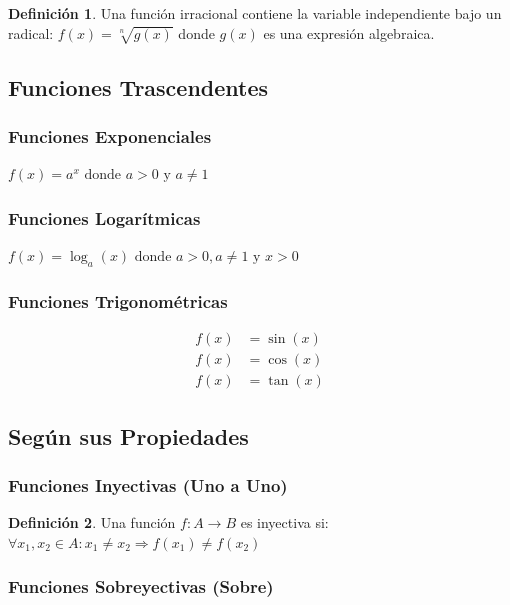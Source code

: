\documentclass[12pt, a4paper, oneside]{book}
\theoremstyle{definition}
\newtheorem{definicion}{Definición}[chapter]
\begin{document}
\begin{definicion}
Una función irracional contiene la variable independiente bajo un radical:
$f(x) = \sqrt[n]{g(x)}$
donde $g(x)$ es una expresión algebraica.
\end{definicion}

\subsection{Funciones Trascendentes}

\subsubsection{Funciones Exponenciales}
$f(x) = a^x \text{ donde } a > 0 \text{ y } a \neq 1$

\subsubsection{Funciones Logarítmicas}
$f(x) = \log_a(x) \text{ donde } a > 0, a \neq 1 \text{ y } x > 0$

\subsubsection{Funciones Trigonométricas}
\begin{align}
f(x) &= \sin(x) \\
f(x) &= \cos(x) \\
f(x) &= \tan(x)
\end{align}

\subsection{Según sus Propiedades}

\subsubsection{Funciones Inyectivas (Uno a Uno)}

\begin{definicion}
Una función $f: A \rightarrow B$ es inyectiva si:
$\forall x_1, x_2 \in A: x_1 \neq x_2 \Rightarrow f(x_1) \neq f(x_2)$
\end{definicion}

\subsubsection{Funciones Sobreyectivas (Sobre)}
\end{document}
